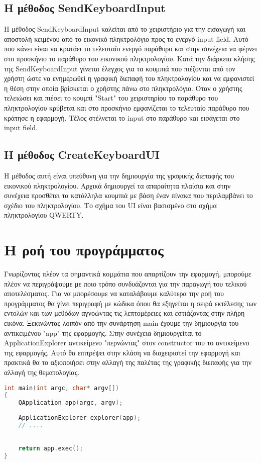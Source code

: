 \subsection{Η μέθοδος SendKeyboardInput}
Η μέθοδος SendKeyboardInput καλείται από το χειριστήριο για την εισαγωγή και αποστολή κειμένου
από το εικονικό πληκτρολόγιο προς το ενεργό input field. Αυτό που κάνει είναι να κρατάει το
τελευταίο ενεργό παράθυρο και στην συνέχεια να φέρνει στο προσκήνιο το παράθυρο του εικονικού
πληκτρολογίου. Κατά την διάρκεια κλήσης της SendKeyboardInput γίνεται έλεγχος για τα κουμπιά
που πιέζονται από τον χρήστη ώστε να ενημερωθεί η γραφική διεπαφή του πληκτρολογίου και να
εμφανιστεί η θέση στην οποία βρίσκεται ο χρήστης πάνω στο πληκτρολόγιο. Όταν ο χρήστης τελειώσει
και πιέσει το κουμπί "Start" του χειριστηρίου το παράθυρο του πληκτρολογίου κρύβεται και στο
προσκήνιο εμφανίζεται το τελευταίο παράθυρο που κράτησε η εφαρμογή. Τέλος στέλνεται το input
στο παράθυρο και εισάγεται στο input field.



\subsection{Η μέθοδος CreateKeyboardUI}

Η μέθοδος αυτή είναι υπεύθυνη για την δημιουργία της γραφικής διεπαφής του εικονικού πληκτρολογίου.
Αρχικά δημιουργεί τα απαραίτητα πλαίσια και στην συνέχεια προσθέτει τα κατάλληλα κουμπιά με βάση
έναν πίνακα που περιλαμβάνει το σχέδιο του πληκτρολογίου. Το σχήμα του UI είναι βασισμένο στο
σχήμα πληκτρολογίου QWERTY.



\section{Η ροή του προγράμματος}
Γνωρίζοντας πλέον τα σημαντικά κομμάτια που απαρτίζουν την εφαρμογή, μπορούμε πλέον να περιγράψουμε
με ποιο τρόπο συνδυάζονται για την παραγωγή του τελικού αποτελέσματος. Για να μπορέσουμε να καταλάβουμε
καλύτερα την ροή του προγράμματος θα γίνει περιγραφή με κώδικα όπου θα εξηγείται η σειρά εκτέλεσης
των εντολών και των μεθόδων αγνοώντας τις λεπτομέρειες και εστιάζοντας στην πλήρη εικόνα. Ξεκινώντας
λοιπόν από την συνάρτηση main έχουμε την δημιουργία του αντικειμένου "app" της εφαρμογής. Στην συνέχεια
δημιουργείται το ApplicationExplorer αντικείμενο "περνώντας" στον constructor του το αντικείμενο της 
εφαρμογής. Αυτό θα επιτρέψει στην κλάση να διαχειριστεί την εφαρμογή και πρακτικά θα το αξιοποιήσει
στην αλλαγή της παλέτας της γραφικής διεπαφής για την αλλαγή της θεματολογίας. 
\begin{lstlisting}[language=C++, style=cppstyle]
int main(int argc, char* argv[]) 
{
    QApplication app(argc, argv);
    
    ApplicationExplorer explorer(app);
    // ....
    

    return app.exec();
}
\end{lstlisting}

